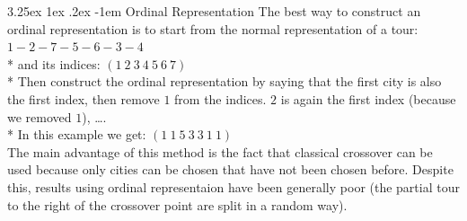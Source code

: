 \documentclass[12pt]{article}
\makeatletter
\renewcommand\paragraph{\@startsection{paragraph}{5}{\z@}%
  {3.25ex \@plus1ex \@minus.2ex}%
  {-1em}%
  {\normalfont\normalsize\bfseries}}
\makeatother
\begin{document}
\paragraph{Ordinal Representation}
The best way to construct an ordinal representation is to start from the normal representation of a tour: $1-2-7-5-6-3-4$\\*
and its indices:
$(1\ 2\ 3\ 4\ 5\ 6\ 7)$\\*
Then construct the ordinal representation by saying that the first city is also the first index, then remove $1$ from the indices. $2$ is again the first index (because we removed $1$), \dots.\\*
In this example we get: $(1\ 1\ 5\ 3\ 3\ 1\ 1)$\\
The main advantage of this method is the fact that classical crossover can be used because only cities can be chosen that have not been chosen before. Despite this, results using ordinal representaion have been generally poor (the partial tour to the right of the crossover point are split in a random way).\\
\end{document}
